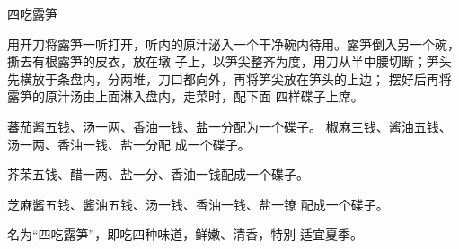 \begin{recipe}{四吃露笋}

\ingredients


\cooking

\step 用开刀将露笋一听打开，听内的原汁泌入一个干净碗内待用。露笋倒入另一个碗，撕去有根露笋的皮衣，放在墩
子上，以笋尖整齐为度，用刀从半中腰切断；笋头先横放于条盘内，分两堆，刀口都向外，再将笋尖放在笋头的上边； 摆好后再将露笋的原汁汤由上面淋入盘内，走菜时，配下面 四样碟子上席。

\step 蕃茄酱五钱、汤一两、香油一钱、盐一分配为一个碟子。
椒麻三钱、酱油五钱、汤一两、香油一钱、盐一分配
成一个碟子。

\step 芥茉五钱、醋一两、盐一分、香油一钱配成一个碟子。

\step 芝麻酱五钱、酱油五钱、汤一钱、香油一钱、盐一镣
配成一个碟子。

\notes

名为“四吃露笋”，即吃四种味道，鲜嫩、清香，特別 适宜夏季。

\end{recipe}

